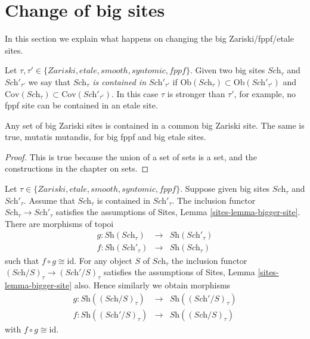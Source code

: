 \section{Change of big sites}
\label{section-change-alpha}

\noindent
In this section we explain what happens on changing the big
Zariski/fppf/etale sites.

\medskip\noindent
Let $\tau, \tau' \in \{Zariski, etale, smooth, syntomic, fppf\}$.
Given two big sites $\textit{Sch}_\tau$ and $\textit{Sch}'_{\tau'}$
we say that
{\it $\textit{Sch}_\tau$ is contained in $\textit{Sch}'_{\tau'}$} if
$\text{Ob}(\textit{Sch}_\tau) \subset \text{Ob}(\textit{Sch}'_{\tau'})$
and
$\text{Cov}(\textit{Sch}_\tau) \subset \text{Cov}(\textit{Sch}'_{\tau'})$.
In this case $\tau$ is stronger than $\tau'$, for example, no fppf
site can be contained in an etale site.

\begin{lemma}
\label{lemma-contained-in}
Any set of big Zariski sites is contained in a common big Zariski site.
The same is true, mutatis mutandis, for big fppf and big etale sites.
\end{lemma}

\begin{proof}
This is true because the union of a set of sets is a set, and the
constructions in the chapter on sets.
\end{proof}

\begin{lemma}
\label{lemma-change-alpha}
Let $\tau \in \{Zariski, etale, smooth, syntomic, fppf\}$.
Suppose given big sites $\textit{Sch}_\tau$ and $\textit{Sch}'_\tau$.
Assume that $\textit{Sch}_\tau$ is contained in $\textit{Sch}'_\tau$.
The inclusion functor $\textit{Sch}_\tau \to \textit{Sch}'_\tau$ satisfies
the assumptions of Sites, Lemma \ref{sites-lemma-bigger-site}.
There are morphisms of topoi
\begin{eqnarray*}
g : \textit{Sh}(\textit{Sch}_\tau) &
\longrightarrow &
\textit{Sh}(\textit{Sch}'_\tau) \\
f : \textit{Sh}(\textit{Sch}'_\tau) &
\longrightarrow &
\textit{Sh}(\textit{Sch}_\tau)
\end{eqnarray*}
such that $f \circ g \cong \text{id}$. For any object $S$
of $\textit{Sch}_\tau$ the inclusion functor
$(\textit{Sch}/S)_\tau \to (\textit{Sch}'/S)_\tau$ satisfies
the assumptions of Sites, Lemma \ref{sites-lemma-bigger-site}
also. Hence similarly we obtain morphisms
\begin{eqnarray*}
g : \textit{Sh}((\textit{Sch}/S)_\tau) &
\longrightarrow &
\textit{Sh}((\textit{Sch}'/S)_\tau) \\
f : \textit{Sh}((\textit{Sch}'/S)_\tau) &
\longrightarrow &
\textit{Sh}((\textit{Sch}/S)_\tau)
\end{eqnarray*}
with $f \circ g \cong \text{id}$.
\end{lemma}

